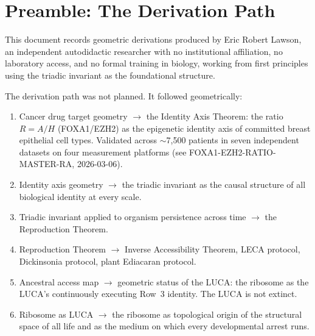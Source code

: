 \documentclass[12pt, a4paper]{article}
\theoremstyle{definition}
\theoremstyle{remark}
\begin{document}
\section{Preamble: The Derivation Path}

This document records geometric derivations produced by Eric
Robert Lawson, an independent autodidactic researcher with no
institutional affiliation, no laboratory access, and no formal
training in biology, working from first principles using the
triadic invariant as the foundational structure.

The derivation path was not planned. It followed geometrically:

\begin{enumerate}[label=\arabic*.]
  \item Cancer drug target geometry $\rightarrow$ the
        Identity Axis Theorem: the ratio $R = A/H$
        (FOXA1/EZH2) as the epigenetic identity axis of
        committed breast epithelial cell types. Validated
        across $\sim$7,500 patients in seven independent
        datasets on four measurement platforms
        (see FOXA1-EZH2-RATIO-MASTER-RA, 2026-03-06).

  \item Identity axis geometry $\rightarrow$ the triadic
        invariant as the causal structure of all biological
        identity at every scale.

  \item Triadic invariant applied to organism persistence
        across time $\rightarrow$ the Reproduction Theorem.

  \item Reproduction Theorem $\rightarrow$ Inverse
        Accessibility Theorem, LECA protocol, Dickinsonia
        protocol, plant Ediacaran protocol.

  \item Ancestral access map $\rightarrow$ geometric status
        of the LUCA: the ribosome as the LUCA's continuously
        executing Row~3 identity. The LUCA is not extinct.

  \item Ribosome as LUCA $\rightarrow$ the ribosome as
        topological origin of the structural space of all
        life and as the medium on which every developmental
        arrest runs.
\end{enumerate}
\end{document}
